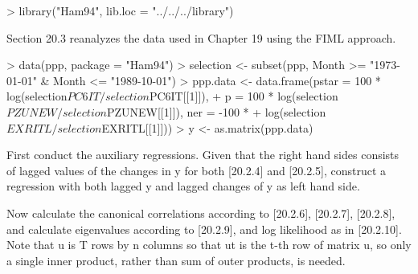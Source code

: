 \begin{Schunk}
\begin{Sinput}
> library("Ham94", lib.loc = "../../../library")
\end{Sinput}
\end{Schunk}
Section 20.3 reanalyzes the data used in Chapter 19 using the FIML approach. 
\begin{Schunk}
\begin{Sinput}
> data(ppp, package = "Ham94")
> selection <- subset(ppp, Month >= "1973-01-01" & Month <= "1989-10-01")
> ppp.data <- data.frame(pstar = 100 * log(selection$PC6IT/selection$PC6IT[[1]]), 
+     p = 100 * log(selection$PZUNEW/selection$PZUNEW[[1]]), ner = -100 * 
+         log(selection$EXRITL/selection$EXRITL[[1]]))
> y <- as.matrix(ppp.data)
\end{Sinput}
\end{Schunk}
First conduct the auxiliary regressions.  Given that the right hand sides consists of lagged values of the changes in y
for both [20.2.4] and [20.2.5], construct a regression with both lagged y and lagged changes of y as left hand side.
\begin{Schunk}
\end{Schunk}
Now calculate the canonical correlations according to [20.2.6], [20.2.7], [20.2.8],
and calculate eigenvalues according to [20.2.9], and log likelihood as in [20.2.10].
Note that u is T rows by n columns
so that ut is the t-th row of matrix u, so only a single inner product, rather than sum of outer products, is needed.
